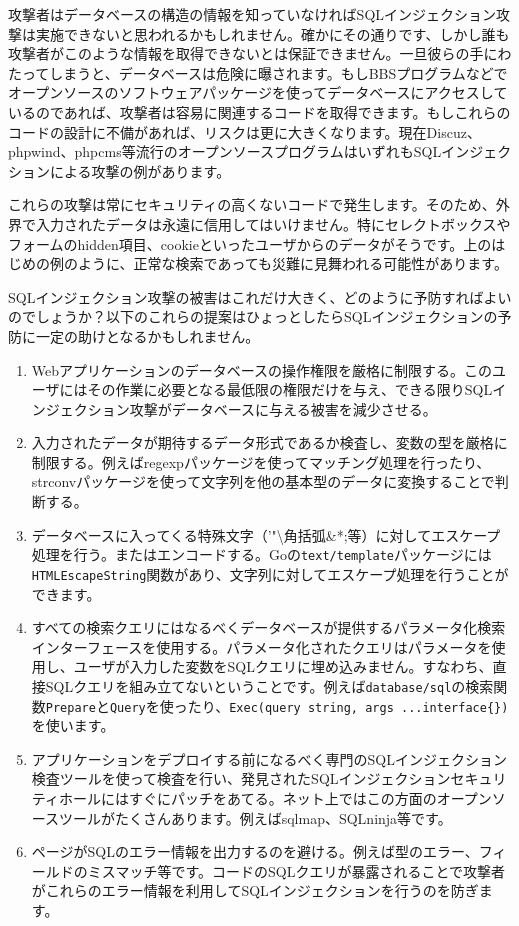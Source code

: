 攻撃者はデータベースの構造の情報を知っていなければSQLインジェクション攻撃は実施できないと思われるかもしれません。確かにその通りです、しかし誰も攻撃者がこのような情報を取得できないとは保証できません。一旦彼らの手にわたってしまうと、データベースは危険に曝されます。もしBBSプログラムなどでオープンソースのソフトウェアパッケージを使ってデータベースにアクセスしているのであれば、攻撃者は容易に関連するコードを取得できます。もしこれらのコードの設計に不備があれば、リスクは更に大きくなります。現在Discuz、phpwind、phpcms等流行のオープンソースプログラムはいずれもSQLインジェクションによる攻撃の例があります。

これらの攻撃は常にセキュリティの高くないコードで発生します。そのため、外界で入力されたデータは永遠に信用してはいけません。特にセレクトボックスやフォームのhidden項目、cookieといったユーザからのデータがそうです。上のはじめの例のように、正常な検索であっても災難に見舞われる可能性があります。

SQLインジェクション攻撃の被害はこれだけ大きく、どのように予防すればよいのでしょうか？以下のこれらの提案はひょっとしたらSQLインジェクションの予防に一定の助けとなるかもしれません。


\begin{enumerate}
  \item Webアプリケーションのデータベースの操作権限を厳格に制限する。このユーザにはその作業に必要となる最低限の権限だけを与え、できる限りSQLインジェクション攻撃がデータベースに与える被害を減少させる。
  \item 入力されたデータが期待するデータ形式であるか検査し、変数の型を厳格に制限する。例えばregexpパッケージを使ってマッチング処理を行ったり、strconvパッケージを使って文字列を他の基本型のデータに変換することで判断する。
  \item データベースに入ってくる特殊文字（'"\textbackslash 角括弧\&*;等）に対してエスケープ処理を行う。またはエンコードする。Goの\texttt{text/template}パッケージには\texttt{HTMLEscapeString}関数があり、文字列に対してエスケープ処理を行うことができます。
  \item すべての検索クエリにはなるべくデータベースが提供するパラメータ化検索インターフェースを使用する。パラメータ化されたクエリはパラメータを使用し、ユーザが入力した変数をSQLクエリに埋め込みません。すなわち、直接SQLクエリを組み立てないということです。例えば\texttt{database/sql}の検索関数\texttt{Prepare}と\texttt{Query}を使ったり、\texttt{Exec(query string, args ...interface\{\})}を使います。
  \item アプリケーションをデプロイする前になるべく専門のSQLインジェクション検査ツールを使って検査を行い、発見されたSQLインジェクションセキュリティホールにはすぐにパッチをあてる。ネット上ではこの方面のオープンソースツールがたくさんあります。例えばsqlmap、SQLninja等です。
  \item ページがSQLのエラー情報を出力するのを避ける。例えば型のエラー、フィールドのミスマッチ等です。コードのSQLクエリが暴露されることで攻撃者がこれらのエラー情報を利用してSQLインジェクションを行うのを防ぎます。
\end{enumerate}



